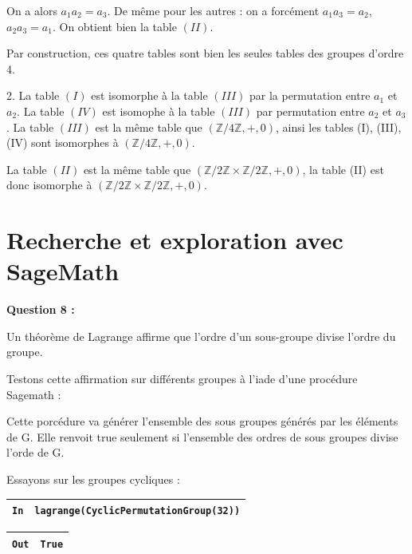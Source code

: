 \documentclass[titlepage]{article}
\begin{document}
    On a alors $a_1a_2 = a_3$. De même pour les autres : on a forcément $a_1a_3 = a_2$, $a_2a_3 = a_1$.
    On obtient bien la table $(II)$.\newline

    Par construction, ces quatre tables sont bien les seules tables des groupes d'ordre 4.\newline

    2. La table $(I)$ est isomorphe à la table $(III)$ par la permutation entre $a_1$ et $a_2$. 
    La table $(IV)$ est isomophe à la table $(III)$ par permutation entre $a_2$ et $a_3$.
    La table $(III)$ est la même table que $(\mathbb{Z}/4\mathbb{Z}, +, 0)$, ainsi les tables (I), (III), (IV) sont isomorphes à $(\mathbb{Z}/4\mathbb{Z}, +, 0)$.\newline

    La table $(II)$ est la même table que $(\mathbb{Z}/2\mathbb{Z} \times \mathbb{Z}/2\mathbb{Z}, +, 0)$, la table (II) est donc isomorphe à $(\mathbb{Z}/2\mathbb{Z} \times \mathbb{Z}/2\mathbb{Z}, +, 0)$.
    \section{Recherche et exploration avec SageMath}
    \textbf{Question 8 :}

    Un théorème de Lagrange affirme que l’ordre d’un sous-groupe divise l’ordre du groupe.

    Testons cette affirmation sur différents groupes à l'iade d'une procédure Sagemath : 

    

    Cette porcédure va générer l'ensemble des sous groupes générés par les éléments de G.
    Elle renvoit true seulement si l'ensemble des ordres de sous groupes divise l'orde de G.

    Essayons sur les groupes cycliques :

    \begin{tabularx}{11.5cm}{|p{0.60cm}|X|}
        \hline
        \verb|In|
        & 
        \verb|lagrange(CyclicPermutationGroup(32))|
        \\
        \hline
    \end{tabularx}\newline
    \begin{tabularx}{11.5cm}{|p{0.60cm}|X|}
        \hline
        \verb|Out|
        & 
        \verb|True|
        \\
        \hline
    \end{tabularx}\newline
\end{document}
